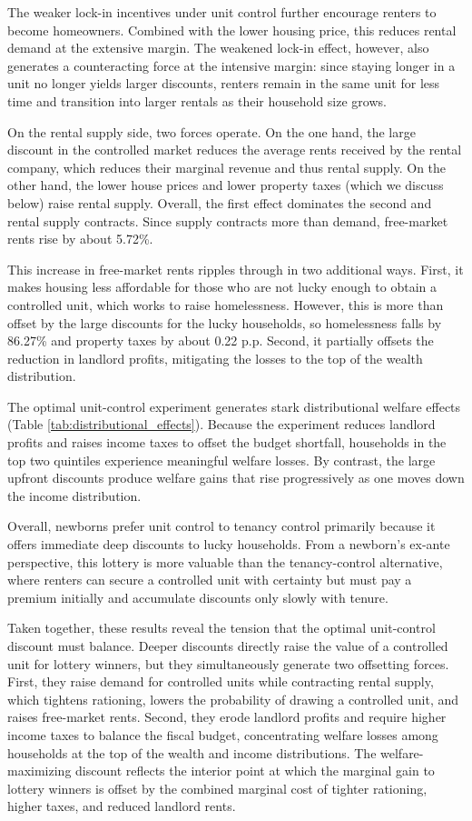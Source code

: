\documentclass[parskip=full]{article}
\begin{document}
The weaker lock-in incentives under unit control further encourage renters to become homeowners. Combined with the lower housing price, this reduces rental demand at the extensive margin. The weakened lock-in effect, however, also generates a counteracting force at the intensive margin: since staying longer in a unit no longer yields larger discounts, renters remain in the same unit for less time and transition into larger rentals as their household size grows.

On the rental supply side, two forces operate. On the one hand, the large discount in the controlled market reduces the average rents received by the rental company, which reduces their marginal revenue and thus rental supply. On the other hand, the lower house prices and lower property taxes (which we discuss below) raise rental supply. Overall, the first effect dominates the second and rental supply contracts. Since supply contracts more than demand, free-market rents rise by about 5.72\%.

This increase in free-market rents ripples through in two additional ways. First, it makes housing less affordable for those who are not lucky enough to obtain a controlled unit, which works to raise homelessness. However, this is more than offset by the large discounts for the lucky households, so homelessness falls by 86.27\% and property taxes by about 0.22 p.p. Second, it partially offsets the reduction in landlord profits, mitigating the losses to the top of the wealth distribution.

The optimal unit-control experiment generates stark distributional welfare effects (Table \ref{tab:distributional_effects}). Because the experiment reduces landlord profits and raises income taxes to offset the budget shortfall, households in the top two quintiles experience meaningful welfare losses. By contrast, the large upfront discounts produce welfare gains that rise progressively as one moves down the income distribution.

Overall, newborns prefer unit control to tenancy control primarily because it offers immediate deep discounts to lucky households. From a newborn's ex-ante perspective, this lottery is more valuable than the tenancy-control alternative, where renters can secure a controlled unit with certainty but must pay a premium initially and accumulate discounts only slowly with tenure.

Taken together, these results reveal the tension that the optimal unit-control discount must balance. Deeper discounts directly raise the value of a controlled unit for lottery winners, but they simultaneously generate two offsetting forces. First, they raise demand for controlled units while contracting rental supply, which tightens rationing, lowers the probability of drawing a controlled unit, and raises free-market rents. Second, they erode landlord profits and require higher income taxes to balance the fiscal budget, concentrating welfare losses among households at the top of the wealth and income distributions. The welfare-maximizing discount reflects the interior point at which the marginal gain to lottery winners is offset by the combined marginal cost of tighter rationing, higher taxes, and reduced landlord rents.
\end{document}
